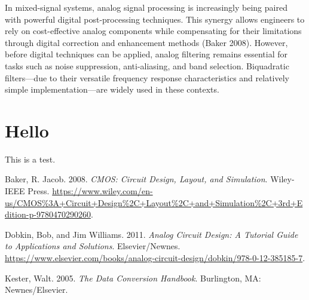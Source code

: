 \documentclass[
  english,
]{scrbook}
\newlength{\cslhangindent}
\newenvironment{CSLReferences}[2] %
 {\begin{list}{}{%
  \setlength{\itemindent}{0pt}
  \setlength{\leftmargin}{0pt}
  \setlength{\parsep}{0pt}
  \ifodd #1
   \setlength{\leftmargin}{\cslhangindent}
   \setlength{\itemindent}{-1\cslhangindent}
  \fi
  \setlength{\itemsep}{#2\baselineskip}}}
 {\end{list}}
\begin{document}
In mixed-signal systems, analog signal processing is increasingly being
paired with powerful digital post-processing techniques. This synergy
allows engineers to rely on cost-effective analog components while
compensating for their limitations through digital correction and
enhancement methods (Baker 2008). However, before digital techniques can
be applied, analog filtering remains essential for tasks such as noise
suppression, anti-aliasing, and band selection. Biquadratic
filters---due to their versatile frequency response characteristics and
relatively simple implementation---are widely used in these contexts.

\chapter{Hello}\label{hello}

This is a test.

\label{refs}
\begin{CSLReferences}{1}{0}
Baker, R. Jacob. 2008. \emph{CMOS: Circuit Design, Layout, and
Simulation}. Wiley-IEEE Press.
\url{https://www.wiley.com/en-us/CMOS\%3A+Circuit+Design\%2C+Layout\%2C+and+Simulation\%2C+3rd+Edition-p-9780470290260}.

Dobkin, Bob, and Jim Williams. 2011. \emph{Analog Circuit Design: A
Tutorial Guide to Applications and Solutions}. Elsevier/Newnes.
\url{https://www.elsevier.com/books/analog-circuit-design/dobkin/978-0-12-385185-7}.

Kester, Walt. 2005. \emph{The Data Conversion Handbook}. Burlington, MA:
Newnes/Elsevier.

\end{CSLReferences}


\backmatter
\end{document}
